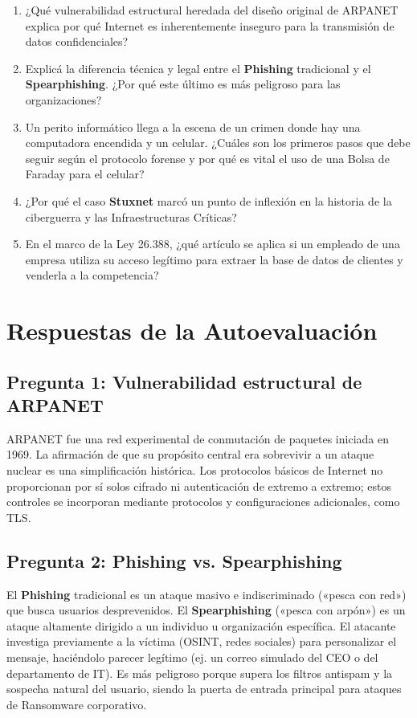 \documentclass[11pt,a4paper]{article}
\begin{document}
\begin{enumerate}[leftmargin=*]
  \item ¿Qué vulnerabilidad estructural heredada del diseño original de ARPANET explica por qué Internet es inherentemente inseguro para la transmisión de datos confidenciales?
  \item Explicá la diferencia técnica y legal entre el \textbf{Phishing} tradicional y el \textbf{Spearphishing}. ¿Por qué este último es más peligroso para las organizaciones?
  \item Un perito informático llega a la escena de un crimen donde hay una computadora encendida y un celular. ¿Cuáles son los primeros pasos que debe seguir según el protocolo forense y por qué es vital el uso de una Bolsa de Faraday para el celular?
  \item ¿Por qué el caso \textbf{Stuxnet} marcó un punto de inflexión en la historia de la ciberguerra y las Infraestructuras Críticas?
  \item En el marco de la Ley 26.388, ¿qué artículo se aplica si un empleado de una empresa utiliza su acceso legítimo para extraer la base de datos de clientes y venderla a la competencia?
\end{enumerate}

\section{Respuestas de la Autoevaluación}\label{sec:respuestas}

\subsection*{Pregunta 1: Vulnerabilidad estructural de ARPANET}
\begin{respuesta}
ARPANET fue una red experimental de conmutación de paquetes iniciada en 1969. La afirmación de que su propósito central era sobrevivir a un ataque nuclear es una simplificación histórica. Los protocolos básicos de Internet no proporcionan por sí solos cifrado ni autenticación de extremo a extremo; estos controles se incorporan mediante protocolos y configuraciones adicionales, como TLS.
\end{respuesta}

\subsection*{Pregunta 2: Phishing vs. Spearphishing}
\begin{respuesta}
El \textbf{Phishing} tradicional es un ataque masivo e indiscriminado («pesca con red») que busca usuarios desprevenidos. El \textbf{Spearphishing} («pesca con arpón») es un ataque altamente dirigido a un individuo u organización específica. El atacante investiga previamente a la víctima (OSINT, redes sociales) para personalizar el mensaje, haciéndolo parecer legítimo (ej. un correo simulado del CEO o del departamento de IT). Es más peligroso porque supera los filtros antispam y la sospecha natural del usuario, siendo la puerta de entrada principal para ataques de Ransomware corporativo.
\end{respuesta}
\end{document}

